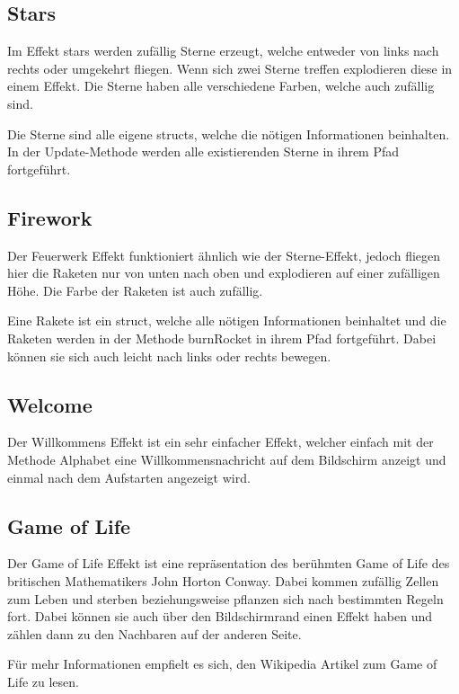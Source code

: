 \documentclass[12pt,a4paper]{article}
\begin{document}
\subsection{Stars}

Im Effekt stars werden zufällig Sterne erzeugt, welche entweder von links nach rechts oder umgekehrt fliegen. Wenn sich zwei Sterne treffen explodieren diese in einem Effekt. Die Sterne haben alle verschiedene Farben, welche auch zufällig sind. 

Die Sterne sind alle eigene structs, welche die nötigen Informationen beinhalten. In der Update-Methode werden alle existierenden Sterne in ihrem Pfad fortgeführt.

\subsection{Firework}

Der Feuerwerk Effekt funktioniert ähnlich wie der Sterne-Effekt, jedoch fliegen hier die Raketen nur von unten nach oben und explodieren auf einer zufälligen Höhe. Die Farbe der Raketen ist auch zufällig.

Eine Rakete ist ein struct, welche alle nötigen Informationen beinhaltet und die Raketen werden in der Methode burnRocket in ihrem Pfad fortgeführt. Dabei können sie sich auch leicht nach links oder rechts bewegen.

\subsection{Welcome}

Der Willkommens Effekt ist ein sehr einfacher Effekt, welcher einfach mit der Methode Alphabet eine Willkommensnachricht auf dem Bildschirm anzeigt und einmal nach dem Aufstarten angezeigt wird.

\subsection{Game of Life}

Der Game of Life Effekt ist eine repräsentation des berühmten Game of Life des britischen Mathematikers John Horton Conway. Dabei kommen  zufällig Zellen zum Leben und sterben beziehungsweise pflanzen sich nach bestimmten Regeln fort. Dabei können sie auch über den Bildschirmrand einen Effekt haben und zählen dann zu den Nachbaren auf der anderen Seite. 

Für mehr Informationen empfielt es sich, den Wikipedia Artikel zum Game of Life zu lesen\cite{GOL}.
\newpage
\end{document}

